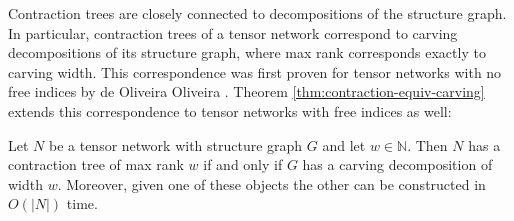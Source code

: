 Contraction trees are closely connected to decompositions of the structure graph. In particular, contraction trees of a tensor network correspond to carving decompositions of its structure graph, where max rank corresponds exactly to carving width. This correspondence was first proven for tensor networks with no free indices by de Oliveira Oliveira \cite{de15}. Theorem \ref{thm:contraction-equiv-carving} extends this correspondence to tensor networks with free indices as well:
\begin{theorem}
	\label{thm:contraction-equiv-carving}
	Let $N$ be a tensor network with structure graph $G$ and let $w \in \mathbb{N}$. Then $N$ has a contraction tree of max rank $w$ if and only if $G$ has a carving decomposition of width $w$. Moreover, given one of these objects the other can be constructed in $O(|N|)$ time.
\end{theorem}
